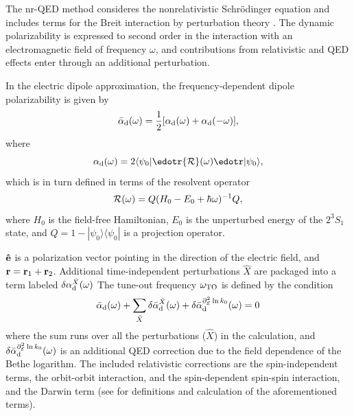 	The nr-QED method consideres the nonrelativistic Schr\"odinger equation and includes terms for the Breit interaction by perturbation theory \cite{BetheSalpeter,Piszczatowski15,Puchalski16,Puchalski20}.  The dynamic polarizability is expressed to second order in the interaction with an electromagnetic field of frequency $\omega$, and contributions from relativistic and QED effects enter through an additional perturbation.  
	
	 In the electric dipole approximation, the frequency-dependent dipole polarizability is given by 
	  \begin{equation}
	  \bar{\alpha}_{\rm d}(\omega) = \frac12[\alpha_{\rm d}(\omega) + \alpha_{\rm d}(-\omega)],
	  \end{equation}
	  where
	\begin{equation}
	\alpha_{\rm d}(\omega) = 2\langle\psi_0|\edotr{\cal R}(\omega)\edotr|\psi_0\rangle,
	\end{equation}
	which is in turn defined in terms of the resolvent operator
	\begin{equation}
	{\cal R}(\omega) = Q(H_0 - E_0 + \hbar\omega)^{-1}Q,
	\end{equation}
	where $H_0$ is the field-free Hamiltonian, $E_0$ is the unperturbed energy of the $2^3S_1$ state, and $Q = 1 - |\psi_0\rangle\langle \psi_0|$ is a projection operator.  

	$\mbox{\boldmath{$\hat{\rm e}$}}$ is a polarization vector pointing in the direction of the electric field, and ${\bf r} = {\bf r}_1 + {\bf r}_2$.  
	Additional time-independent perturbations $\hat{X}$ are packaged into a term labeled $\delta\alpha_{\rm d}^{\hat{X}}(\omega)$
	The tune-out frequency $\omega_{\rm TO}$ is defined by the condition
	\begin{equation}
	\label{eq:baralpha}
	\bar{\alpha}_{\rm d}(\omega) + \sum_{\hat{X}} \delta\bar{\alpha}_{\rm d}^{\hat{X}}(\omega) +
	\delta\bar{\alpha}_{\rm d}^{\partial_{\cal E}^2\ln k_0}(\omega) = 0
	\end{equation}
	where the sum runs over all the perturbations ($\hat{X}$) in the calculation, and $\delta\bar{\alpha}_{\rm d}^{\partial_{\cal E}^2\ln k_0}(\omega)$ is an additional QED correction due to the field dependence of the Bethe logarithm. The included relativistic corrections are the spin-independent terms, the orbit-orbit interaction, and the  spin-dependent spin-spin interaction, and the Darwin term (see \cite{ArxivTO} for definitions and calculation of the aforementioned terms).

